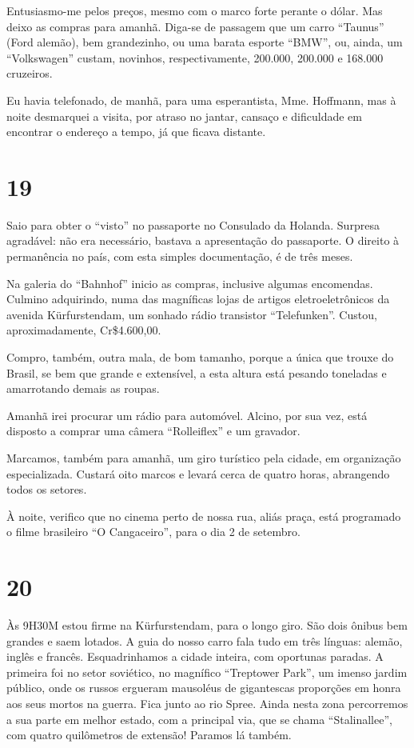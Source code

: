 Entusiasmo-me pelos preços, mesmo com o marco forte perante o dólar. Mas deixo as compras para amanhã. Diga-se de passagem que um carro ``Taunus'' (Ford alemão), bem grandezinho, ou uma barata esporte ``BMW'', ou, ainda, um ``Volkswagen'' custam, novinhos, respectivamente, 200.000, 200.000 e 168.000 cruzeiros.

Eu havia telefonado, de manhã, para uma esperantista, Mme. Hoffmann, mas à noite desmarquei a visita, por atraso no jantar, cansaço e dificuldade em encontrar o endereço a tempo, já que ficava distante.

\section*{19 \adfflatleafright {}}
Saio para obter o ``visto'' no passaporte no Consulado da Holanda. Surpresa agradável: não era necessário, bastava a apresentação do passaporte. O direito à permanência no país, com esta simples documentação, é de três meses.

Na galeria do ``Bahnhof'' inicio as compras, inclusive algumas encomendas. Culmino adquirindo, numa das magníficas lojas de artigos eletroeletrônicos da avenida Kürfurstendam, um sonhado rádio transistor ``Telefunken''. Custou, aproximadamente, Cr\$4.600,00.

Compro, também, outra mala, de bom tamanho, porque a única que trouxe do Brasil, se bem que grande e extensível, a esta altura está pesando toneladas e amarrotando demais as roupas.

Amanhã irei procurar um rádio para automóvel. Alcino, por sua vez, está disposto a comprar uma câmera ``Rolleiflex'' e um gravador.

Marcamos, também para amanhã, um giro turístico pela cidade, em organização especializada. Custará oito marcos e levará cerca de quatro horas, abrangendo todos os setores.

À noite, verifico que no cinema perto de nossa rua, aliás praça, está programado o filme brasileiro ``O Cangaceiro'', para o dia 2 de setembro.

\section*{20 \adfflatleafright {}}
Às 9H30M estou firme na Kürfurstendam, para o longo giro. São dois ônibus bem grandes e saem lotados. A guia do nosso carro fala tudo em três línguas: alemão, inglês e francês. Esquadrinhamos a cidade inteira, com oportunas paradas. A primeira foi no setor soviético, no magnífico ``Treptower Park'', um imenso jardim público, onde os russos ergueram mausoléus de gigantescas proporções em honra aos seus mortos na guerra. Fica junto ao rio Spree. Ainda nesta zona percorremos a sua parte em melhor estado, com a principal via, que se chama ``Stalinallee'', com quatro quilômetros de extensão! Paramos lá também.

